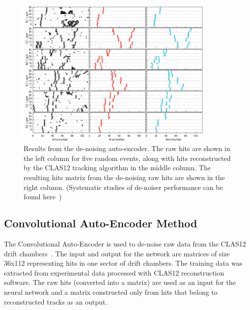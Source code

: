 \documentclass{webofc}
\begin{document}
\begin{figure}[!h]
\begin{center}
 \includegraphics[width=3.8in]{images/cnn_denoise_results.pdf}
\caption {Results from the de-noising auto-encoder. The raw hits are shown
in the left column for five random events, along with hits reconstructed by the 
CLAS12 tracking algorithm in the middle column. The resulting  hits matrix 
from the de-noising raw hits are shown in the right column. (Systematic studies 
of de-noiser performance can be found here~\cite{Thomadakis:2022zcd})}
 \label{network:cnn_results}
 \end{center}
\end{figure}


\subsection{Convolutional Auto-Encoder Method}
\label{aue-method}

The Convolutional Auto-Encoder is used to de-noise raw data from the CLAS12 drift chambers~\cite{Thomadakis:2022zcd}. 
The input and output for the network are matrices of size 36x112 representing hits in one sector of drift chambers. 
The training data was extracted from experimental data processed with CLAS12 reconstruction software. 
The raw hits (converted into a matrix) are used as an input for the neural network and a matrix constructed 
only from hits that belong to reconstructed tracks as an output. 
\end{document}
